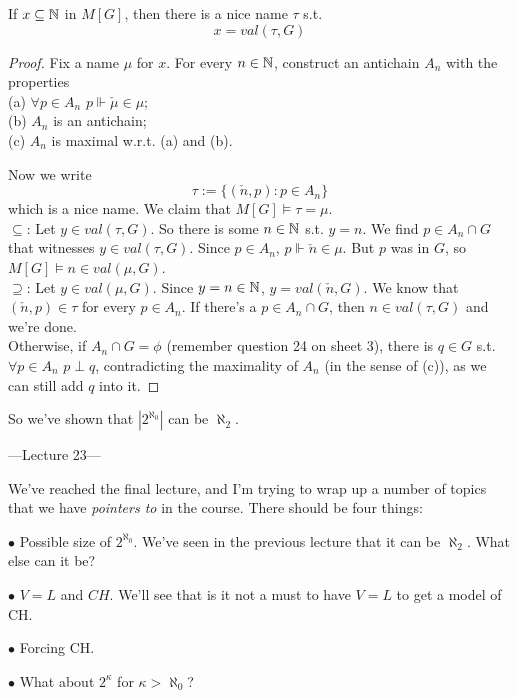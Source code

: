 \documentclass[a4paper]{article}
\begin{document}
\begin{thm}
If $x \subseteq \mathbb{N}$ in $M[G]$, then there is a nice name $\tau$ s.t.
\[
x = val(\tau,G)
\]
\begin{proof}
Fix a name $\mu$ for $x$. For every $n \in \mathbb{N}$, construct an antichain $A_n$ with the properties\\
(a) $\forall p \in A_n$ $p \Vdash \check{\mu} \in \mu$;\\
(b) $A_n$ is an antichain;\\
(c) $A_n$ is maximal w.r.t. (a) and (b).

Now we write
\[
\tau:=\{(\check{n},p): p \in A_n\}
\]
which is a nice name. We claim that $M[G] \vDash \tau = \mu$.\\
$\subseteq$: Let $y \in val(\tau,G)$. So there is some $n \in \mathbb{N}$ s.t. $y = n$. We find $p \in A_n \cap G$ that witnesses $y \in val(\tau,G)$. Since $p \in A_n$, $p \Vdash \check{n} \in \mu$. But $p$ was in $G$, so $M[G] \vDash n \in val(\mu,G)$.\\
$\supseteq$:  Let $y \in val(\mu,G)$. Since $y = n \in \mathbb{N}$, $y = val(\check{n},G)$. We know that $(\check{n},p) \in \tau$ for every $p \in A_n$. If there's a $p \in A_n \cap G$, then $n \in val(\tau,G)$ and we're done.\\
Otherwise, if $A_n \cap G = \phi$ (remember question 24 on sheet 3), there is $q \in G$ s.t. $\forall p \in A_n$ $p \perp q$, contradicting the maximality of $A_n$ (in the sense of (c)), as we can still add $q$ into it.
\end{proof}
\end{thm}
So we've shown that $|2^{\aleph_0}|$ can be $\aleph_2$.

---Lecture 23---

We've reached the final lecture, and I'm trying to wrap up a number of topics that we have \emph{pointers to} in the course. There should be four things:

$\bullet$ Possible size of $2^{\aleph_0}$. We've seen in the previous lecture that it can be $\aleph_2$. What else can it be?

$\bullet$ $V=L$ and $CH$. We'll see that is it not a must to have $V=L$ to get a model of CH.

$\bullet$ Forcing CH.

$\bullet$ What about $2^\kappa$ for $\kappa > \aleph_0$?
\end{document}
